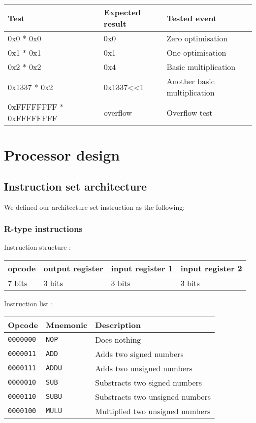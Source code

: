 \documentclass[a4paper]{report}
\begin{document}
\begin{center}
	\begin{tabular}{|l|l|l|}
		\hline
		Test & Expected result & Tested event \\
		\hline \hline
		0x0 * 0x0 & 0x0 & Zero optimisation \\
		0x1 * 0x1 & 0x1 & One optimisation \\
		0x2 * 0x2 & 0x4 & Basic multiplication \\
		0x1337 * 0x2 & 0x1337<<1 & Another basic multiplication \\
		0xFFFFFFFF * 0xFFFFFFFF & overflow & Overflow test \\
		\hline
	\end{tabular}
\end{center}

\section{Processor design}

\subsection{Instruction set architecture}

We defined our architecture set instruction as the following:

\subsubsection{R-type instructions}

Instruction structure :

\begin{center}
	\begin{tabular}{|l|l|l|l|}
		\hline
		opcode & output register & input register 1 & input register 2 \\
		\hline
		7 bits & 3 bits & 3 bits & 3 bits \\
		\hline
	\end{tabular}
\end{center}

Instruction list :

\begin{center}
	\begin{tabular}{|l|l|l|}
		\hline
		Opcode & Mnemonic & Description \\
		\hline \hline
		\texttt{0000000} & \texttt{NOP} &  Does nothing \\
		\texttt{0000011} & \texttt{ADD} &  Adds two signed numbers \\
		\texttt{0000111} & \texttt{ADDU} & Adds two unsigned numbers \\
		\texttt{0000010} & \texttt{SUB} &  Substracts two signed numbers \\
		\texttt{0000110} & \texttt{SUBU} & Substracts two unsigned numbers \\
		\texttt{0000100} & \texttt{MULU} & Multiplied two unsigned numbers \\
		\hline
	\end{tabular}
\end{center}
\end{document}
